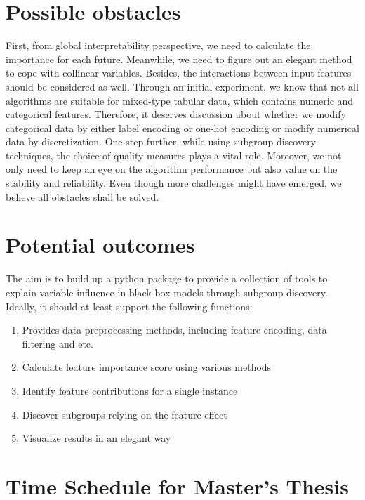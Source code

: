 \documentclass[runningheads]{llncs}
\begin{document}
	\section{Possible obstacles}
	
	First, from global interpretability perspective, we need to calculate the importance for each future. Meanwhile, we need to figure out an elegant method to cope with collinear variables. Besides, the interactions between input features should be considered as well. Through an initial experiment, we know that not all algorithms are suitable for mixed-type tabular data, which contains numeric and categorical features. Therefore, it deserves discussion about whether we modify categorical data by either label encoding or one-hot encoding or modify numerical data by discretization. One step further, while using subgroup discovery techniques, the choice of quality measures plays a vital role. Moreover, we not only need to keep an eye on the algorithm performance but also value on the stability and reliability. Even though more challenges might have emerged, we believe all obstacles shall be solved. 
	
	\section{Potential outcomes}
	
	The aim is to build up a python package to provide a collection of tools to explain variable influence in black-box models through subgroup discovery. Ideally, it should at least support the following functions:
	
	\begin{enumerate}
		\item Provides data preprocessing methods, including feature encoding, data filtering and etc.
		\item Calculate feature importance score using various methods
		\item Identify feature contributions for a single instance
		\item Discover subgroups relying on the feature effect
		\item Visualize results in an elegant way
	\end{enumerate}
	
	\section{Time Schedule for Master’s Thesis }
	
\end{document}
